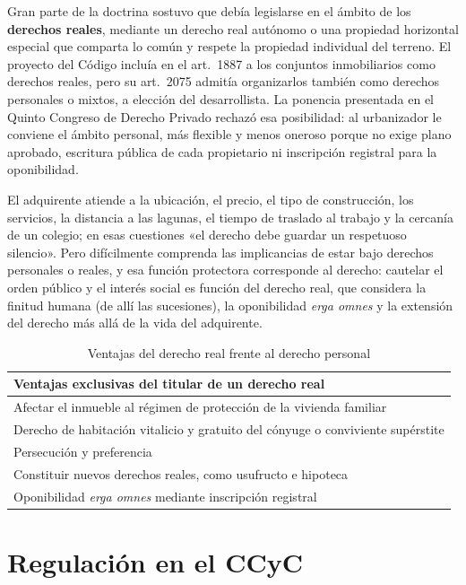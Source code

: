 \documentclass[12pt,oneside]{book}
\begin{document}
Gran parte de la doctrina sostuvo que debía legislarse en el ámbito de los \textbf{derechos reales}, mediante un derecho real autónomo o una propiedad horizontal especial que comparta lo común y respete la propiedad individual del terreno. El proyecto del Código incluía en el art.~1887 a los conjuntos inmobiliarios como derechos reales, pero su art.~2075 admitía organizarlos también como derechos personales o mixtos, a elección del desarrollista. La ponencia presentada en el Quinto Congreso de Derecho Privado rechazó esa posibilidad: al urbanizador le conviene el ámbito personal, más flexible y menos oneroso porque no exige plano aprobado, escritura pública de cada propietario ni inscripción registral para la oponibilidad.

El adquirente atiende a la ubicación, el precio, el tipo de construcción, los servicios, la distancia a las lagunas, el tiempo de traslado al trabajo y la cercanía de un colegio; en esas cuestiones «el derecho debe guardar un respetuoso silencio». Pero difícilmente comprenda las implicancias de estar bajo derechos personales o reales, y esa función protectora corresponde al derecho: cautelar el orden público y el interés social es función del derecho real, que considera la finitud humana (de allí las sucesiones), la oponibilidad \textit{erga omnes} y la extensión del derecho más allá de la vida del adquirente.

\begin{table}[H]
\centering
\small
\begin{tabularx}{\textwidth}{>{\raggedright\arraybackslash}X}
\toprule
\textbf{Ventajas exclusivas del titular de un derecho real} \\
\midrule
Afectar el inmueble al régimen de protección de la vivienda familiar \\
Derecho de habitación vitalicio y gratuito del cónyuge o conviviente supérstite \\
Persecución y preferencia \\
Constituir nuevos derechos reales, como usufructo e hipoteca \\
Oponibilidad \textit{erga omnes} mediante inscripción registral \\
\bottomrule
\end{tabularx}
\caption{Ventajas del derecho real frente al derecho personal}
\end{table}

\section{Regulación en el CCyC}
\end{document}
